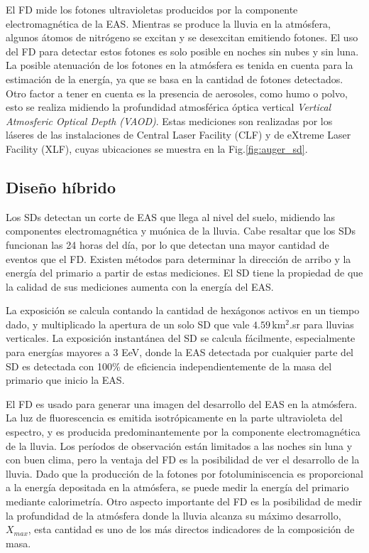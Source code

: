 El FD mide los fotones ultravioletas producidos por la componente electromagnética de la EAS. Mientras se produce la lluvia en la atmósfera, algunos átomos de nitrógeno se excitan y se desexcitan emitiendo fotones. El uso del FD para detectar estos fotones es solo posible en noches sin nubes y sin luna. La posible atenuación de los fotones en la atmósfera es tenida en cuenta para la estimación de la energía, ya que se basa en la cantidad de fotones detectados. Otro factor a tener en cuenta es la presencia de aerosoles, como humo o polvo, esto se realiza midiendo la profundidad atmosférica óptica vertical \emph{Vertical Atmosferic Optical Depth (VAOD)}. Estas mediciones son realizadas por los láseres de las instalaciones de Central Laser Facility (CLF) y de eXtreme Laser Facility (XLF), cuyas ubicaciones se muestra en la Fig.\ref{fig:auger_sd}.

\subsection{Diseño híbrido}\label{seccion:sd_eff}
Los SDs detectan un corte de EAS que llega al nivel del suelo, midiendo las componentes electromagnética y muónica de la lluvia. Cabe resaltar que los SDs funcionan las 24 horas del día, por lo que detectan una mayor cantidad de eventos que el FD. Existen métodos para determinar la dirección de arribo y la energía del primario a partir de estas mediciones.  El SD tiene la propiedad de que la calidad de sus mediciones aumenta con la energía del EAS. 

La exposición se calcula contando la cantidad de hexágonos activos en un tiempo dado, y multiplicado la apertura de un solo SD que vale $4.59\,$km$^2$.sr para lluvias verticales. La exposición instantánea del SD se calcula fácilmente, especialmente para energías mayores a 3 EeV, donde la EAS detectada por cualquier parte del SD es detectada con 100\% de eficiencia independientemente de la masa del primario que inicio la EAS.

El FD es usado para generar una imagen del desarrollo del EAS en la atmósfera. La luz de fluorescencia es emitida isotrópicamente en la parte ultravioleta del espectro, y es producida predominantemente por la componente electromagnética de la lluvia. Los períodos de observación están limitados a las noches sin luna y con buen clima, pero la ventaja del FD es la posibilidad de ver el desarrollo de la lluvia. Dado que la producción de la fotones por fotoluminiscencia es proporcional a la energía depositada en la atmósfera, se puede medir la energía del primario mediante calorimetría. Otro aspecto importante del FD es la posibilidad de medir la profundidad de la atmósfera donde la lluvia alcanza su máximo desarrollo, $X_{max}$, esta cantidad es uno de los más directos indicadores de la composición de masa. \cite{data}

